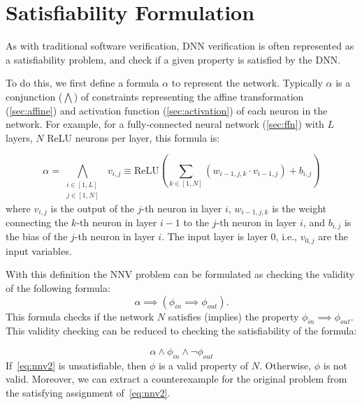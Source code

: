 \documentclass[oneside,11pt,dvipsnames]{book}
\numberwithin{equation}{section}
\theoremstyle{definition}
\theoremstyle{remark}
\newcommand{\relu}[1]{\mathrm{ReLU}\left(#1\right)}
\begin{document}
\section{Satisfiability Formulation}\label{sec:satisfiability-and-activation-pattern-search}

As with traditional software verification, DNN verification is often represented as a satisfiability problem, and check if a given property is satisfied by the DNN. 

To do this, we first define a formula $\alpha$ to represent the network. Typically $\alpha$ is a conjunction ($\bigwedge$) of constraints representing the affine transformation (\autoref{sec:affine}) and activation function (\autoref{sec:activation}) of each neuron in the network.
For example, for a fully-connected neural network (\autoref{sec:ffn}) with $L$ layers, $N$ ReLU neurons per layer, this formula is:

\begin{equation}
\alpha = \bigwedge_{\begin{smallmatrix}i \in [1,L]\\ j \in [1,N]\end{smallmatrix}}~~v_{i,j} \equiv \relu{\sum_{k \in [1,N]} (w_{i-1,j,k} \cdot v_{i-1,j}) + b_{i,j}}
\end{equation}
where $v_{i,j}$ is the output of the $j$-th neuron in layer $i$, $w_{i-1,j,k}$ is the weight connecting the $k$-th neuron in layer $i-1$ to the $j$-th neuron in layer $i$, and $b_{i,j}$ is the bias of the $j$-th neuron in layer $i$.  The input layer is layer 0, i.e., $v_{0,j}$ are the input variables.

With this definition the NNV problem can be formulated as checking the validity of the following formula:
\begin{equation}\label{eq:nnv}
    \alpha \implies (\phi_{in} \implies \phi_{out}).
\end{equation}
This formula checks if the network $N$ satisfies (implies) the property $\phi_{in} \implies \phi_{out}$. This validity checking can be reduced to checking the satisfiability of the formula:

\begin{equation}\label{eq:nnv2}
  \alpha \land \phi_{in} \land \neg \phi_{out}
\end{equation}
If~\autoref{eq:nnv2} is unsatisfiable, then $\phi$ is a valid property of $N$. Otherwise, $\phi$ is not valid.  Moreover, we can extract a counterexample for the original problem from the satisfying assignment of~\autoref{eq:nnv2}.
\end{document}
